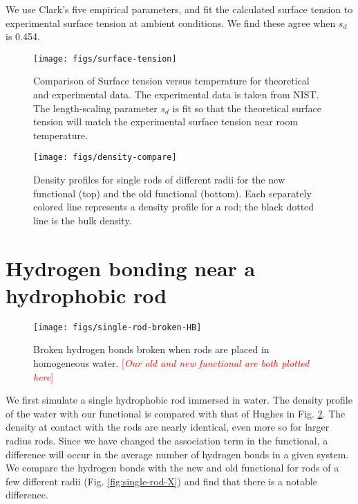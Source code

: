 \documentclass[twocolumn,amsmath,amssymb,prl]{revtex4-1}
\newcommand\lscale{\ensuremath{s_d}}
\newcommand{\fixme}[1]{\textcolor{red}{[\emph{#1}]}}
\begin{document}
We use Clark's five empirical parameters, and fit the calculated
surface tension to experimental surface tension at ambient conditions.
We find these agree when $\lscale$ is 0.454.

\begin{figure}
\begin{center}
\texttt{[image: figs/surface-tension]}
\end{center}
\caption{Comparison of Surface tension versus temperature for theoretical and
  experimental data. The experimental data is taken from NIST.\cite{nistwater}
  The length-scaling parameter $\lscale$ is fit so that the theoretical surface 
  tension will match the experimental surface tension near room temperature.}
\label{fig:surface-tension}
\end{figure}

\begin{figure}
\begin{center}
\texttt{[image: figs/density-compare]}
\end{center}
\caption{ Density profiles for single rods of different
  radii for the new functional (top) and the old functional
  (bottom). Each separately colored line represents a density profile
  for a rod; the black dotted line is the bulk density.}
\label{fig:density-single-rod}
\end{figure}

\section{Hydrogen bonding near a hydrophobic rod}

\begin{figure}
\begin{center}
\texttt{[image: figs/single-rod-broken-HB]}
\end{center}
\caption{ Broken hydrogen bonds broken when rods are placed in
  homogeneous water.  \fixme{Our old and new functional are both plotted here}}
\label{fig:single-rod-broken-HB}
\end{figure}

We first simulate a single hydrophobic rod immersed in water. The
density profile of the water with our functional is compared with that
of Hughes in Fig. \ref{fig:density-single-rod}. The density at contact
with the rods are nearly identical, even more so for larger radius
rods. Since we have changed the association term in the functional, a
difference will occur in the average number of hydrogen bonds in a
given system. We compare the hydrogen bonds with the new and old
functional for rods of a few different radii
(Fig. \ref{fig:single-rod-X}) and find that there is a notable
difference.
\end{document}
